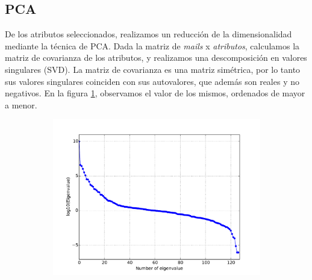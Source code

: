 \documentclass[a4paper,10pt]{article}
\begin{document}

\subsection{PCA}

\par De los atributos seleccionados, realizamos un reducción de la dimensionalidad
mediante la técnica de PCA. Dada la matriz de \emph{mails} x \emph{atributos},
calculamos la matriz de covarianza de los atributos, y realizamos una descomposición en valores singulares (SVD). La matriz de covarianza es una matriz simétrica, por lo tanto sus valores singulares coinciden con sus autovalores, que además son reales y no negativos. En la figura \ref{fig:autovalores}, observamos el valor de los mismos, ordenados de mayor a menor. 
  \begin{figure}[H]
    \centering
    \begin{subfigure}[b]{0.4\textwidth}
      \includegraphics[width=\textwidth]{../imagenes/Autovalores}
      \caption{}
    \end{subfigure}
    \label{fig:autovalores}
  \end{figure}
\end{document}
